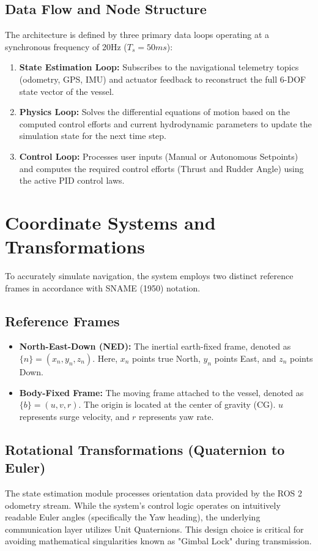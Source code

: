 \documentclass[12pt, a4paper, oneside]{report}
\begin{document}
\subsection{Data Flow and Node Structure}
The architecture is defined by three primary data loops operating at a synchronous frequency of 20Hz ($T_s = 50ms$):

\begin{enumerate}
    \item \textbf{State Estimation Loop:} Subscribes to the navigational telemetry topics (odometry, GPS, IMU) and actuator feedback to reconstruct the full 6-DOF state vector of the vessel.
    \item \textbf{Physics Loop:} Solves the differential equations of motion based on the computed control efforts and current hydrodynamic parameters to update the simulation state for the next time step.
    \item \textbf{Control Loop:} Processes user inputs (Manual or Autonomous Setpoints) and computes the required control efforts (Thrust and Rudder Angle) using the active PID control laws.

\end{enumerate}

\section{Coordinate Systems and Transformations}
To accurately simulate navigation, the system employs two distinct reference frames in accordance with SNAME (1950) notation.

\subsection{Reference Frames}
\begin{itemize}
    \item \textbf{North-East-Down (NED):} The inertial earth-fixed frame, denoted as $\{n\} = (x_n, y_n, z_n)$. Here, $x_n$ points true North, $y_n$ points East, and $z_n$ points Down.
    \item \textbf{Body-Fixed Frame:} The moving frame attached to the vessel, denoted as $\{b\} = (u, v, r)$. The origin is located at the center of gravity (CG). $u$ represents surge velocity, and $r$ represents yaw rate.
\end{itemize}

\subsection{Rotational Transformations (Quaternion to Euler)}
The state estimation module processes orientation data provided by the ROS 2 odometry stream. While the system's control logic operates on intuitively readable Euler angles (specifically the Yaw heading), the underlying communication layer utilizes Unit Quaternions. This design choice is critical for avoiding mathematical singularities known as "Gimbal Lock" during transmission.
\end{document}
